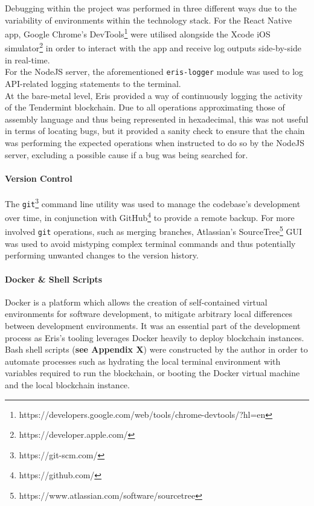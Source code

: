 Debugging within the project was performed in three different ways due
to the variability of environments within the technology stack. For the
React Native app, Google Chrome's
DevTools\footnote{https://developers.google.com/web/tools/chrome-devtools/?hl=en}
were utilised alongside the Xcode iOS
simulator\footnote{https://developer.apple.com/} in order to interact with the app and receive log outputs
side-by-side in real-time.\\
For the NodeJS server, the aforementioned \texttt{eris-logger} module
was used to log API-related logging statements to the terminal.\\
At the bare-metal level, Eris provided a way of continuously logging the
activity of the Tendermint blockchain. Due to all operations
approximating those of assembly language and thus being represented in
hexadecimal, this was not useful in terms of locating bugs, but it
provided a sanity check to ensure that the chain was performing the
expected operations when instructed to do so by the NodeJS server,
excluding a possible cause if a bug was being searched for.

\paragraph{Version Control}\label{version-control}

The \texttt{git}\footnote{https://git-scm.com/} command line utility
was used to manage the codebase's development over time, in conjunction
with GitHub\footnote{https://github.com/} to provide a remote
backup. For more involved \texttt{git} operations, such as merging
branches, Atlassian's
SourceTree\footnote{https://www.atlassian.com/software/sourcetree}
GUI was used to avoid mistyping complex terminal commands and thus
potentially performing unwanted changes to the version history.

\paragraph{Docker \& Shell Scripts}\label{docker-shell-scripts}

Docker\cite{1docker} is a platform which
allows the creation of self-contained virtual environments for software
development, to mitigate arbitrary local differences between development
environments. It was an essential part of the development process as
Eris's tooling leverages Docker heavily to deploy blockchain
instances.\\
Bash shell scripts (\textbf{see Appendix X}) were constructed by the
author in order to automate processes such as hydrating the local
terminal environment with variables required to run the blockchain, or
booting the Docker virtual machine and the local blockchain instance.


